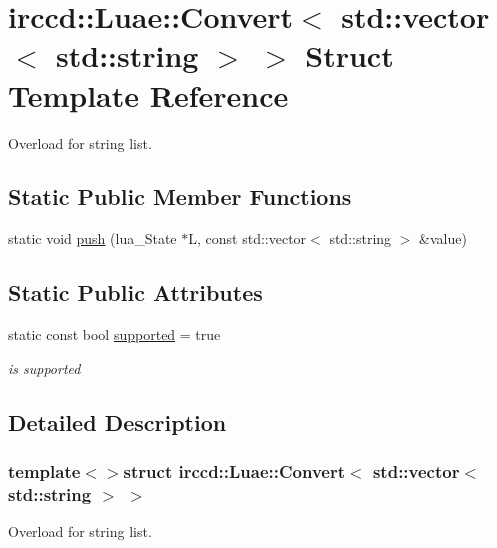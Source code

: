 \hypertarget{a00016}{\section{irccd\-:\-:Luae\-:\-:Convert$<$ std\-:\-:vector$<$ std\-:\-:string $>$ $>$ Struct Template Reference}
\label{a00016}
}


Overload for string list.  


\subsection*{Static Public Member Functions}
\begin{DoxyCompactItemize}
\item 
static void \hyperlink{a00016_a2c5d57bf5a00ed3b5fe3acb0c2dab3ef}{push} (lua\-\_\-\-State $\ast$L, const std\-::vector$<$ std\-::string $>$ \&value)
\end{DoxyCompactItemize}
\subsection*{Static Public Attributes}
\begin{DoxyCompactItemize}
\item 
\hypertarget{a00016_ae42623844067fa761a096ab0b9905651}{static const bool \hyperlink{a00016_ae42623844067fa761a096ab0b9905651}{supported} = true}\label{a00016_ae42623844067fa761a096ab0b9905651}

\begin{DoxyCompactList}\small\item\em is supported \end{DoxyCompactList}\end{DoxyCompactItemize}


\subsection{Detailed Description}
\subsubsection*{template$<$$>$struct irccd\-::\-Luae\-::\-Convert$<$ std\-::vector$<$ std\-::string $>$ $>$}

Overload for string list. 

